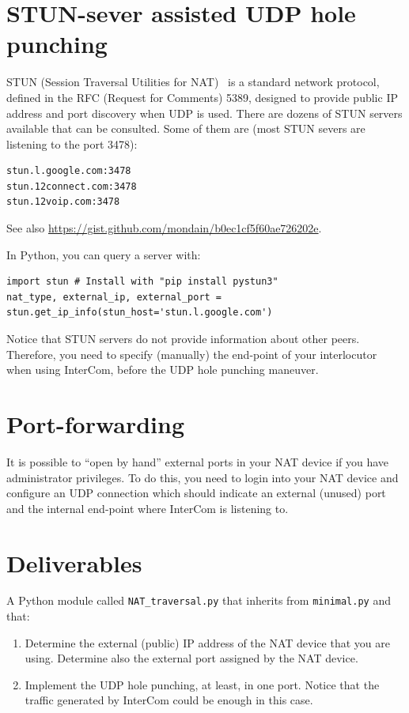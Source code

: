\section{STUN-sever assisted UDP hole punching}

STUN (Session Traversal Utilities for NAT)~\cite{STUN} is a standard
network protocol, defined in the RFC (Request for Comments) 5389,
designed to provide public IP address and port discovery when UDP is
used. There are dozens of STUN servers available that can be
consulted. Some of them are (most STUN severs are listening to the
port 3478):
\begin{verbatim}
stun.l.google.com:3478
stun.12connect.com:3478
stun.12voip.com:3478
\end{verbatim}
See also \url{https://gist.github.com/mondain/b0ec1cf5f60ae726202e}.

In Python, you can query a server with:
\begin{verbatim}
import stun # Install with "pip install pystun3"
nat_type, external_ip, external_port = stun.get_ip_info(stun_host='stun.l.google.com')
\end{verbatim}

Notice that STUN servers do not provide information about other
peers. Therefore, you need to specify (manually) the end-point of your
interlocutor when using InterCom, before the UDP hole punching
maneuver.

\section{Port-forwarding}

It is possible to ``open by hand'' external ports in your NAT device
if you have administrator privileges. To do this, you need to login
into your NAT device and configure an UDP connection which should
indicate an external (unused) port and the internal end-point where
InterCom is listening to.

\section{Deliverables}

A Python module called \texttt{NAT\_traversal.py} that inherits from
\texttt{minimal.py} and that:
\begin{enumerate}
\item Determine the external (public) IP address of the NAT device that you are
  using. Determine also the external port assigned by the NAT device.
\item Implement the UDP hole punching, at least, in one port. Notice
  that the traffic generated by InterCom could be enough in this case.
\end{enumerate}


